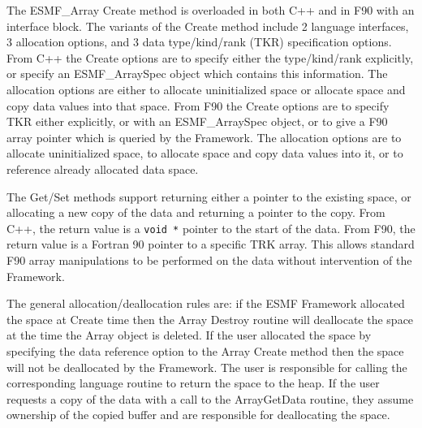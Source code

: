 


The ESMF\_Array Create method is overloaded in both C++ and in
F90 with an interface block.
The variants of the Create method include
2 language interfaces, 3 allocation options, and 3 data type/kind/rank
(TKR)
specification options.  From C++ the Create options are to specify
either the type/kind/rank explicitly, or specify an ESMF\_ArraySpec
object which contains this information.  The allocation options 
are either to allocate uninitialized space or allocate space and
copy data values into that space.  From F90 the Create options
are to specify TKR either explicitly, or with an ESMF\_ArraySpec
object, or to give a F90 array pointer which is queried by the
Framework.  The allocation options are to allocate uninitialized
space, to allocate space and copy data values into it, or to
reference already allocated data space.


The Get/Set methods support returning either a pointer to
the existing space, or allocating a new copy of the data
and returning a pointer to the copy.  From C++, the return 
value is a {\tt void *} pointer to the start of the data.
From F90, the return value is a Fortran 90 pointer to a
specific TRK array.  This allows standard F90 array manipulations
to be performed on the data without intervention of the Framework.

The general allocation/deallocation rules are: if the ESMF Framework
allocated the space at Create time then the Array Destroy routine 
will deallocate the space at the time the Array object is deleted.  
If the user allocated the space by specifying the data 
reference option to the Array Create method then  
the space will not
be deallocated by the Framework. The user is responsible
for calling the corresponding language routine to return the
space to the heap.  If the user requests a copy of the data with
a call to the ArrayGetData routine, they assume ownership of
the copied buffer and are responsible for deallocating the space.


